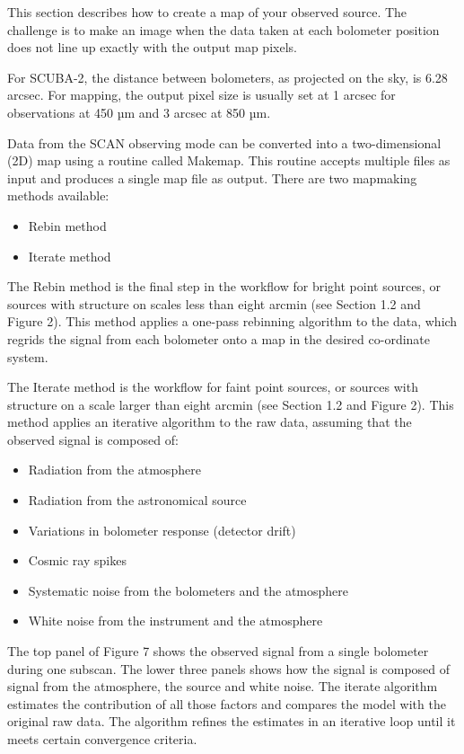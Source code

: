 \documentclass[twoside,11pt]{article}
\renewcommand{\_}{\texttt{\symbol{95}}}
\begin{document}
This section describes how to create a map of your observed
source. The challenge is to make an image when the data taken at each
bolometer position does not line up exactly with the output map
pixels.

For SCUBA-2, the distance between bolometers, as projected on the sky,
is 6.28 arcsec. For mapping, the output pixel size is usually set at 1
arcsec for observations at 450 µm and 3 arcsec at 850 µm.

Data from the SCAN observing mode can be converted into a
two-dimensional (2D) map using a routine called Makemap. This routine
accepts multiple files as input and produces a single map file as
output. There are two mapmaking methods available:
\begin{itemize}
\item Rebin method
\item Iterate method
\end{itemize}

The Rebin method is the final step in the workflow for bright point
sources, or sources with structure on scales less than eight arcmin
(see Section 1.2 and Figure 2). This method applies a one-pass
rebinning algorithm to the data, which regrids the signal from each
bolometer onto a map in the desired co-ordinate system.

The Iterate method is the workflow for faint point sources, or sources
with structure on a scale larger than eight arcmin (see Section 1.2
and Figure 2). This method applies an iterative algorithm to the raw
data, assuming that the observed signal is composed of:
\begin{itemize}
\item Radiation from the atmosphere
\item Radiation from the astronomical source
\item Variations in bolometer response (detector drift)
\item Cosmic ray spikes
\item Systematic noise from the bolometers and the atmosphere
\item White noise from the instrument and the atmosphere
\end{itemize}

The top panel of Figure 7 shows the observed signal from a single
bolometer during one subscan. The lower three panels shows how the
signal is composed of signal from the atmosphere, the source and white
noise. The iterate algorithm estimates the contribution of all those
factors and compares the model with the original raw data. The
algorithm refines the estimates in an iterative loop until it meets
certain convergence criteria.
\end{document}
